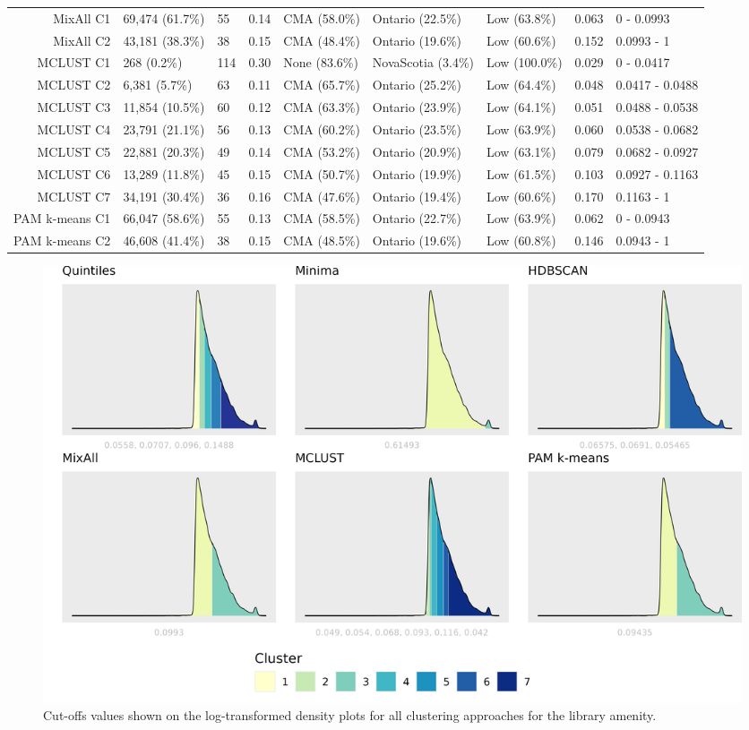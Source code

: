 \documentclass[11pt, a4paper]{article}
\begin{document}
\begin{table}[H]
{\begin{tabular}{|r|llllllll|}
  MixAll C1 & 69,474 (61.7\%) & 55 & 0.14 & CMA (58.0\%) & Ontario (22.5\%) & Low (63.8\%) & 0.063 & 0 - 0.0993 \\
  MixAll C2 & 43,181 (38.3\%) & 38 & 0.15 & CMA (48.4\%) & Ontario (19.6\%) & Low (60.6\%) & 0.152 & 0.0993 - 1 \\
\rowcolor{gray!25}  MCLUST C1 & 268 (0.2\%) & 114 & 0.30 & None (83.6\%) & NovaScotia (3.4\%) & Low (100.0\%) & 0.029 & 0 - 0.0417 \\
\rowcolor{gray!25}  MCLUST C2 & 6,381 (5.7\%) & 63 & 0.11 & CMA (65.7\%) & Ontario (25.2\%) & Low (64.4\%) & 0.048 & 0.0417 - 0.0488 \\
\rowcolor{gray!25}  MCLUST C3 & 11,854 (10.5\%) & 60 & 0.12 & CMA (63.3\%) & Ontario (23.9\%) & Low (64.1\%) & 0.051 & 0.0488 - 0.0538 \\
 \rowcolor{gray!25} MCLUST C4 & 23,791 (21.1\%) & 56 & 0.13 & CMA (60.2\%) & Ontario (23.5\%) & Low (63.9\%) & 0.060 & 0.0538 - 0.0682 \\
 \rowcolor{gray!25} MCLUST C5 & 22,881 (20.3\%) & 49 & 0.14 & CMA (53.2\%) & Ontario (20.9\%) & Low (63.1\%) & 0.079 & 0.0682 - 0.0927 \\
\rowcolor{gray!25}  MCLUST C6 & 13,289 (11.8\%) & 45 & 0.15 & CMA (50.7\%) & Ontario (19.9\%) & Low (61.5\%) & 0.103 & 0.0927 - 0.1163 \\
\rowcolor{gray!25}  MCLUST C7 & 34,191 (30.4\%) & 36 & 0.16 & CMA (47.6\%) & Ontario (19.4\%) & Low (60.6\%) & 0.170 & 0.1163 - 1 \\
  PAM k-means C1 & 66,047 (58.6\%) & 55 & 0.13 & CMA (58.5\%) & Ontario (22.7\%) & Low (63.9\%) & 0.062 & 0 - 0.0943 \\
  PAM k-means C2 & 46,608 (41.4\%) & 38 & 0.15 & CMA (48.5\%) & Ontario (19.6\%) & Low (60.8\%) & 0.146 & 0.0943 - 1 \\
   \hline
\end{tabular}
}
\end{table}





\begin{figure}[H]
\centering
\includegraphics[width=\textwidth]{./cutoffs/by_amenity/Library_cutoffs.png}
\caption[Library cutoffs]{Cut-offs values shown on the log-transformed density plots for all clustering approaches for the library amenity.}\label{librarycutoffs}
\end{figure}
\end{document}
